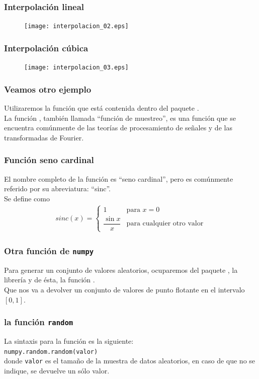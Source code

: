 \begin{frame}
\frametitle{Interpolación lineal}
\begin{figure}
\hspace*{-0.2cm}\texttt{[image: interpolacion\_02.eps]}
\end{figure}
\end{frame}
\begin{frame}
\frametitle{Interpolación cúbica}
\begin{figure}
\hspace*{-0.2cm}\texttt{[image: interpolacion\_03.eps]}
\end{figure}
\end{frame}
\begin{frame}
\frametitle{Veamos otro ejemplo}
Utilizaremos la función  que está contenida dentro del paquete .
\\
\bigskip
\pause
La función , también llamada \enquote{función de muestreo}, es una función que se encuentra comúnmente de las teorías de procesamiento de señales y de las transformadas de Fourier.
\end{frame}
\begin{frame}
\frametitle{Función seno cardinal}
El nombre completo de la función es \enquote{seno cardinal}, pero es comúnmente referido por su abreviatura: \enquote{sinc}.
\\
\bigskip
Se define como
\begin{align*}
sinc(x) = \begin{cases}
1 & \mbox{para } x = 0 \\[0.5em]
\dfrac{\sin x}{x} & \mbox{para cualquier otro valor} \end{cases}
\end{align*}
\end{frame}
\begin{frame}
\frametitle{Otra función de \texttt{numpy}}
Para generar un conjunto de valores aleatorios, ocuparemos del paquete , la librería  y de ésta, la función .
\\
\bigskip
\pause
Que nos va a devolver un conjunto de valores de punto flotante en el intervalo $[0, 1]$.
\end{frame}
\begin{frame}[fragile]
\frametitle{la función \texttt{random}}
La sintaxis para la función  es la siguiente:
\\
\bigskip
\verb|numpy.random.random(valor)|
\\
\bigskip
donde \texttt{valor} es el tamaño de la muestra de datos aleatorios, en caso de que no se indique, se devuelve un sólo valor.
\end{frame}
